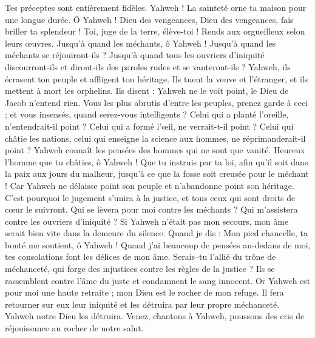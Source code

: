 \begin{multicols}{2}
Tes préceptes sont entièrement fidèles. Yahweh ! La sainteté orne ta maison pour une longue durée.
\VerseOne{}Ô Yahweh ! Dieu des vengeances, Dieu des vengeances, fais briller ta splendeur !
Toi, juge de la terre, élève-toi ! Rends aux orgueilleux selon leurs œuvres.
Jusqu'à quand les méchants, ô Yahweh ! Jusqu'à quand les méchants se réjouiront-ils ?
Jusqu'à quand tous les ouvriers d'iniquité discourront-ils et diront-ils des paroles rudes et se vanteront-ils ?
Yahweh, ils écrasent ton peuple et affligent ton héritage.
Ils tuent la veuve et l'étranger, et ils mettent à mort les orphelins.
Ils disent : Yahweh ne le voit point, le Dieu de Jacob n'entend rien.
Vous les plus abrutis d'entre les peuples, prenez garde à ceci ; et vous insensés, quand serez-vous intelligents ?
Celui qui a planté l'oreille, n'entendrait-il point ? Celui qui a formé l'œil, ne verrait-t-il point ?
Celui qui châtie les nations, celui qui enseigne la science aux hommes, ne réprimanderait-il point ?
Yahweh connaît les pensées des hommes qui ne sont que vanité.
Heureux l'homme que tu châties, ô Yahweh ! Que tu instruis par ta loi,
afin qu'il soit dans la paix aux jours du malheur, jusqu'à ce que la fosse soit creusée pour le méchant !
Car Yahweh ne délaisse point son peuple et n'abandonne point son héritage.
C'est pourquoi le jugement s'unira à la justice, et tous ceux qui sont droits de cœur le suivront.
Qui se lèvera pour moi contre les méchants ? Qui m'assistera contre les ouvriers d'iniquité ?
Si Yahweh n'était pas mon secours, mon âme serait bien vite dans la demeure du silence.
Quand je dis : Mon pied chancelle, ta bonté me soutient, ô Yahweh !
Quand j'ai beaucoup de pensées au-dedans de moi, tes consolations font les délices de mon âme.
Serais–tu l'allié du trône de méchanceté, qui forge des injustices contre les règles de la justice ?
Ils se rassemblent contre l'âme du juste et condamnent le sang innocent.
Or Yahweh est pour moi une haute retraite ; mon Dieu est le rocher de mon refuge.
Il fera retourner sur eux leur iniquité et les détruira par leur propre méchanceté. Yahweh notre Dieu les détruira.
\VerseOne{}Venez, chantons à Yahweh, poussons des cris de réjouissance au rocher de notre salut.

\end{multicols}
